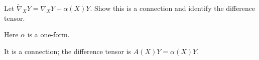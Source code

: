\begin{exercise}\label{exr:vii21-ped-16}
Let \(\widetilde\nabla_XY=\nabla_XY+\alpha(X)Y\).  Show this is a connection and identify the difference tensor.
\end{exercise}

\begin{hint}
Here \(\alpha\) is a one-form.
\end{hint}

\begin{solution}
It is a connection; the difference tensor is \(A(X)Y=\alpha(X)Y\).
\end{solution}

